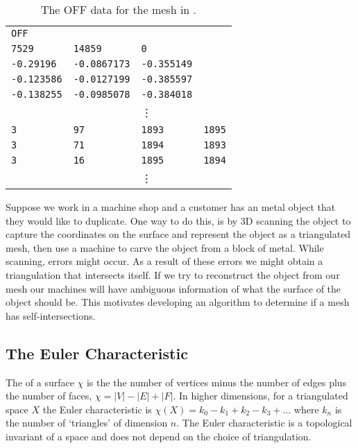 \begin{table}[h!]
\caption{The OFF data for the mesh in .}
\centering
\begin{tabular}{|p{2cm} p{2cm} p{2cm} p{2cm}|} 
 \hline
\texttt{OFF} &  & &  \\ 
\texttt{7529} & \texttt{14859} & \texttt{0} &  \\ 
\texttt{-0.29196} & \texttt{-0.0867173} & \texttt{-0.355149}  &  \\
 \texttt{-0.123586}   & \texttt{-0.0127199} & \texttt{-0.385597} &  \\
\texttt{-0.138255}   & \texttt{-0.0985078} & \texttt{-0.384018} &  \\
  & &\vdots &  \\  
 \texttt{3}&  \texttt{97} &\texttt{1893}& \texttt{1895}\\
 \texttt{3}& \texttt{71} & \texttt{1894} & \texttt{1893} \\
 \texttt{3} & \texttt{16} & \texttt{1895} & \texttt{1894}\\
   & &\vdots &  \\  
 \hline
\end{tabular}

\label{tab:off}
\end{table}

Suppose we work in a machine shop and a customer has an metal object that they would like
to duplicate.
One way to do this, is by 3D scanning the object to capture the coordinates on the 
surface and represent the object as a triangulated mesh, then use a machine to carve the object
from a block of metal. 
While scanning, errors might occur. As a result of these errors
we might obtain a triangulation that intersects itself. If we try to reconstruct the object
from our mesh our machines will have ambiguous information of what the surface of the object
should be.
This motivates developing an algorithm to determine if a mesh has self-intersections.

\subsection{The Euler Characteristic}

The  of a surface $\chi$ is the 
the number of vertices minus the number of edges plus  the number of faces, $\chi=|V|-|E|+|F|.$
In higher dimensions, for a triangulated space $X$ the Euler characteristic is 
$\chi(X)=k_0-k_1+k_2-k_3+\ldots$ where $k_n$ is the number of `triangles' of dimension $n.$
The Euler characteristic is a topological invariant of a space
and does not depend on the choice of triangulation.

